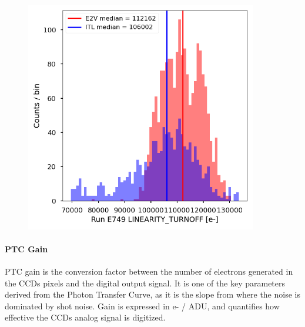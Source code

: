 \begin{figure}
\begin{centering}
\includegraphics[width=0.9\textwidth]{sections/figures/baselineCharacterization/LINEARITY_TURNOFF_E749_sensorType.png}
\end{centering}
\end{figure}

\paragraph{PTC Gain}\label{ptc-gain}

PTC gain is the conversion factor between the number of electrons
generated in the CCD\textquotesingle s pixels and the digital output
signal. It is one of the key parameters derived from the Photon Transfer
Curve, as it is the slope from where the noise is dominated by shot
noise. Gain is expressed in e- / ADU, and quantifies how effective the
CCD\textquotesingle s analog signal is digitized.

